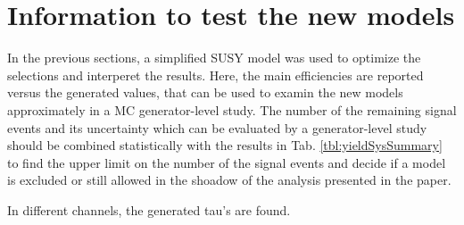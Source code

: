 \section{Information to test the new models}
\label{sect:model}
In the previous sections, a simplified SUSY model was used to optimize the selections and interperet the results. 
Here, the main efficiencies are reported versus the generated values, that can be used to examin the new models approximately in 
a MC generator-level study. The number of the remaining signal events and its uncertainty which can be evaluated by a generator-level study 
should be combined statistically with the results in Tab. \ref{tbl:yieldSysSummary} to find the upper limit on the number of the signal events
and decide if a model is excluded or still allowed in the shoadow of the analysis presented in the paper.

In different channels, the generated tau's are found. 
